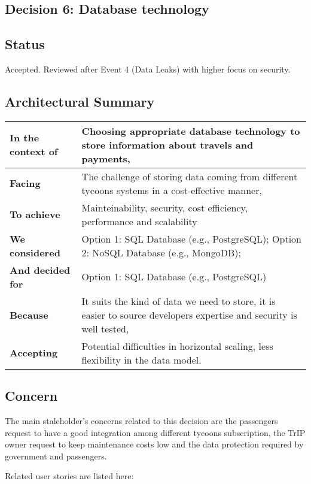 \subsection{Decision 6: Database technology}

\subsection*{Status}
Accepted. Reviewed after Event 4 (Data Leaks) with higher focus on security. 

\subsection*{Architectural Summary}
\begin{tabular}{|p{3.5cm}|p{10.5cm}|}
    \hline
    \textbf{In the context of} & Choosing appropriate database technology to store information about travels and payments, \\
    \hline
    \textbf{Facing} & The challenge of storing data coming from different tycoons systems in a cost-effective manner, \\
    \hline
    \textbf{To achieve} & Mainteinability, security, cost efficiency, performance and scalability \\
    \hline
    \textbf{We considered} & Option 1: SQL Database (e.g., PostgreSQL); Option 2: NoSQL Database (e.g., MongoDB); \\
    \hline
    \textbf{And decided for} & Option 1: SQL Database (e.g., PostgreSQL) \\
    \hline
    \textbf{Because} & It suits the kind of data we need to store, it is easier to source developers expertise and security is well tested, \\
    \hline
    \textbf{Accepting} & Potential difficulties in horizontal scaling, less flexibility in the data model. \\
    \hline
\end{tabular}

\subsection*{Concern}
The main staleholder's concerns related to this decision are the passengers request to have a good integration among different tycoons subscription, the TrIP owner request to keep maintenance costs low and the data protection required by government and passengers.

Related user stories are listed here:

